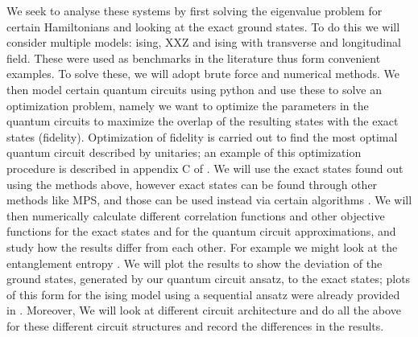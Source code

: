 \documentclass{physics_article}
\begin{document}
	We seek to analyse these systems by first solving the eigenvalue problem for certain Hamiltonians and looking at the exact ground states. To do this we will consider multiple models: ising, XXZ and ising with transverse and longitudinal field. These were used as benchmarks in the literature \cite{PhysRevResearch.4.L022020,PRXQuantum.2.010342,PhysRevResearch.4.033118} thus form convenient examples. To solve these, we will adopt brute force and numerical methods. We then model certain quantum circuits using python and use these to solve an optimization problem, namely we want to optimize the parameters in the quantum circuits to maximize the overlap of the resulting states with the exact states (fidelity). Optimization of fidelity is carried out to find the most optimal quantum circuit described by unitaries; an example of this optimization procedure is described in appendix C of \cite{PRXQuantum.2.010342}. We will use the exact states found out using the methods above, however exact states can be found through other methods like MPS, and those can be used instead via certain algorithms \cite{PRXQuantum.2.010342}. We will then numerically calculate different correlation functions and other objective functions for the exact states and for the quantum circuit approximations, and study how the results differ from each other. For example we might look at the entanglement entropy \cite{PhysRevResearch.4.033118}. We will plot the results to show the deviation of the ground states, generated by our quantum circuit ansatz, to the exact states; plots of this form for the ising model using a sequential ansatz were already provided in \cite{PRXQuantum.2.010342}. Moreover, We will look at different circuit architecture and do all the above for these different circuit structures and record the differences in the results.
\end{document}
